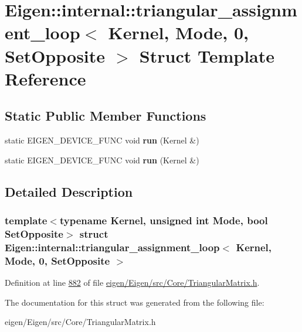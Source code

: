 \hypertarget{struct_eigen_1_1internal_1_1triangular__assignment__loop_3_01_kernel_00_01_mode_00_010_00_01_set_opposite_01_4}{}\section{Eigen\+:\+:internal\+:\+:triangular\+\_\+assignment\+\_\+loop$<$ Kernel, Mode, 0, Set\+Opposite $>$ Struct Template Reference}
\label{struct_eigen_1_1internal_1_1triangular__assignment__loop_3_01_kernel_00_01_mode_00_010_00_01_set_opposite_01_4}
\subsection*{Static Public Member Functions}
\begin{DoxyCompactItemize}
\item 
\mbox{\label{struct_eigen_1_1internal_1_1triangular__assignment__loop_3_01_kernel_00_01_mode_00_010_00_01_set_opposite_01_4_aff2b0c2fdbd41a210f485ce83175df7b}} 
static E\+I\+G\+E\+N\+\_\+\+D\+E\+V\+I\+C\+E\+\_\+\+F\+U\+NC void {\bfseries run} (Kernel \&)
\item 
\mbox{\label{struct_eigen_1_1internal_1_1triangular__assignment__loop_3_01_kernel_00_01_mode_00_010_00_01_set_opposite_01_4_aff2b0c2fdbd41a210f485ce83175df7b}} 
static E\+I\+G\+E\+N\+\_\+\+D\+E\+V\+I\+C\+E\+\_\+\+F\+U\+NC void {\bfseries run} (Kernel \&)
\end{DoxyCompactItemize}


\subsection{Detailed Description}
\subsubsection*{template$<$typename Kernel, unsigned int Mode, bool Set\+Opposite$>$\newline
struct Eigen\+::internal\+::triangular\+\_\+assignment\+\_\+loop$<$ Kernel, Mode, 0, Set\+Opposite $>$}



Definition at line \hyperlink{eigen_2_eigen_2src_2_core_2_triangular_matrix_8h_source_l00882}{882} of file \hyperlink{eigen_2_eigen_2src_2_core_2_triangular_matrix_8h_source}{eigen/\+Eigen/src/\+Core/\+Triangular\+Matrix.\+h}.



The documentation for this struct was generated from the following file\+:\begin{DoxyCompactItemize}
\item 
eigen/\+Eigen/src/\+Core/\+Triangular\+Matrix.\+h\end{DoxyCompactItemize}
